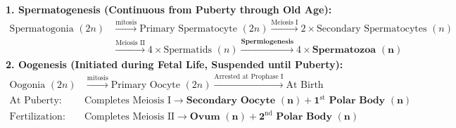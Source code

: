 \documentclass[10pt,a4paper]{article}
\begin{document}
\begin{formulabox}
\textbf{1. Spermatogenesis (Continuous from Puberty through Old Age):}
\begin{align*}
  \text{Spermatogonia } (2n) & \xrightarrow{\text{mitosis}} \text{Primary Spermatocyte } (2n) \xrightarrow{\text{Meiosis I}} 2 \times \text{Secondary Spermatocytes } (n)\\
  & \xrightarrow{\text{Meiosis II}} 4 \times \text{Spermatids } (n) \xrightarrow{\mathbf{Spermiogenesis}} 4 \times \mathbf{\text{Spermatozoa } (n)}
\end{align*}
\textbf{2. Oogenesis (Initiated during Fetal Life, Suspended until Puberty):}
\begin{align*}
  \text{Oogonia } (2n) & \xrightarrow{\text{mitosis}} \text{Primary Oocyte } (2n) \xrightarrow{\text{Arrested at Prophase I}} \text{At Birth}\\
  \text{At Puberty: } & \text{Completes Meiosis I} \longrightarrow \mathbf{\text{Secondary Oocyte } (n)} + \mathbf{1^{\mathrm{st}} \text{ Polar Body } (n)}\\
  \text{Fertilization: } & \text{Completes Meiosis II} \longrightarrow \mathbf{\text{Ovum } (n)} + \mathbf{2^{\mathrm{nd}} \text{ Polar Body } (n)}
\end{align*}
\end{formulabox}
\end{document}
